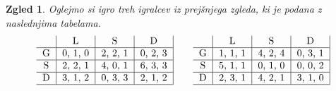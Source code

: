 \documentclass[10pt, a4paper]{article}
\newtheorem{zgled}[izr]{Zgled}
\begin{document}
\begin{zgled}
  Oglejmo si igro treh igralcev iz prejšnjega zgleda, ki je podana z naslednjima tabelama.
    $$
  {\begin{tabular}{c|c|c|c|}
    & \textrm{L} & \textrm{S} & \textrm{D}\\
    \hline
    \textrm{G} & 0, 1, 0 & 2, 2, 1 & 0, 2, 3\\
    \hline
    \textrm{S} & 2, 2, 1 & 4, 0, 1 & 6, 3, 3\\
    \hline
    \textrm{D} & 3, 1, 2 & 0, 3, 3 & 2, 1, 2\\
    \hline
  \end{tabular}}
  \qquad
  {\begin{tabular}{c|c|c|c|}
    & \textrm{L} & \textrm{S} & \textrm{D}\\
    \hline
    \textrm{G} & 1, 1, 1 & 4, 2, 4 & 0, 3, 1\\
    \hline
    \textrm{S} & 5, 1, 1 & 0, 1, 0 & 0, 0, 2\\
    \hline
    \textrm{D} & 2, 3, 1 & 4, 2, 1 & 3, 1, 0\\
    \hline
\end{tabular}}
$$
  

\end{zgled}
\end{document}
